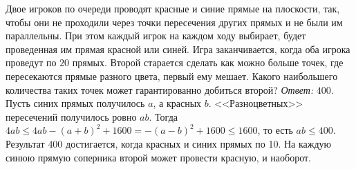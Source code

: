\problem
Двое игроков по очереди проводят красные и синие прямые на плоскости, так,
чтобы они не проходили через точки пересечения других прямых и не были им
параллельны.
При этом каждый игрок на каждом ходу выбирает, будет проведенная им прямая
красной или синей.
Игра заканчивается, когда оба игрока проведут по $20$ прямых.
Второй старается сделать как можно больше точек, где пересекаются прямые
разного цвета, первый ему мешает.
Какого наибольшего количества таких точек может гарантированно добиться второй?
\solution
\emph{Ответ:}
$400$.
Пусть синих прямых получилось $a$, а красных $b$.
<<Разноцветных>> пересечений получилось ровно $a b$.
Тогда
\(
    4 a b
\leq
    4 a b - (a + b)^2 + 1600
=
    -(a - b)^2 + 1600
\leq
    1600
\),
то есть $a b \leq 400$.
Результат $400$ достигается, когда красных и синих прямых по 10.
На каждую синюю прямую соперника второй может провести красную, и наоборот.
\endproblem
